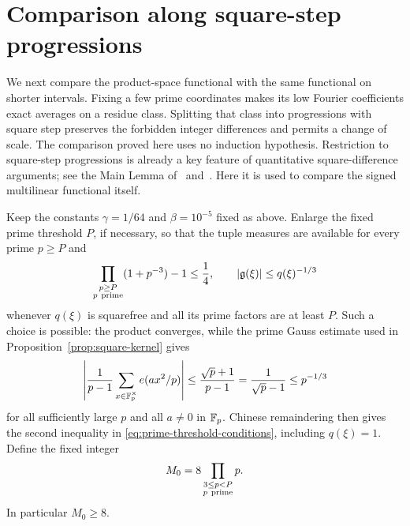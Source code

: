 \section{Comparison along square-step progressions}
\label{sec:scale-transfer}

We next compare the product-space functional with the same functional on
shorter intervals.  Fixing a few prime coordinates makes its low Fourier
coefficients exact averages on a residue class.  Splitting that class into
progressions with square step preserves the forbidden integer differences
and permits a change of scale.  The comparison proved here uses no induction
hypothesis. Restriction to square-step progressions is already a key
feature of quantitative square-difference arguments; see the Main Lemma
of~\cite{PSS1988} and~\cite[Lemma~6.2]{GreenSawhney2025}. Here it is
used to compare the signed multilinear functional itself.

Keep the constants \(\gamma=1/64\) and \(\beta=10^{-5}\) fixed as above.
Enlarge the fixed prime threshold \(P\), if necessary, so that the tuple
measures are available for every prime \(p\ge P\) and
\begin{equation}
 \prod_{\substack{p\ge P\\p\ {\rm prime}}}(1+p^{-3})-1\le\frac14,
 \qquad
 |\mathfrak g(\xi)|\le q(\xi)^{-1/3}
 \label{eq:prime-threshold-conditions}
\end{equation}
whenever \(q(\xi)\) is squarefree and all its prime factors are at least
\(P\).  Such a choice is possible: the product converges, while the prime
Gauss estimate used in Proposition~\ref{prop:square-kernel} gives
\[
 \left|\frac1{p-1}\sum_{x\in\mathbb F_p^\times}e(ax^2/p)\right|
 \le\frac{\sqrt p+1}{p-1}
 =\frac1{\sqrt p-1}\le p^{-1/3}
\]
for all sufficiently large \(p\) and all \(a\ne0\) in \(\mathbb F_p\).
Chinese remaindering then gives the second inequality in
\eqref{eq:prime-threshold-conditions}, including \(q(\xi)=1\).
Define the fixed integer
\begin{equation}
 M_0=8\prod_{\substack{3\le p<P\\p\ {\rm prime}}}p.
 \label{eq:fixed-small-modulus}
\end{equation}
In particular \(M_0\ge8\).

